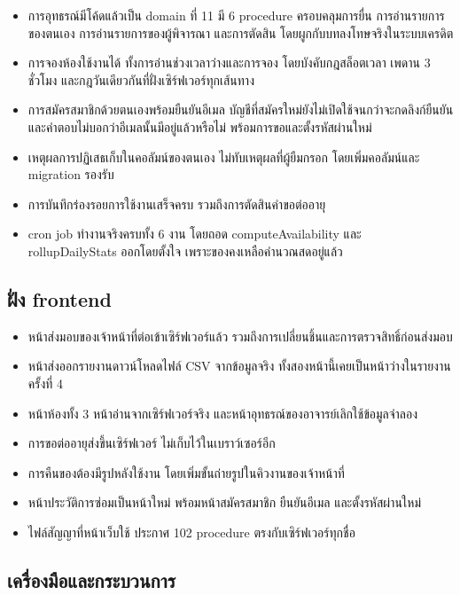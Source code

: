 \begin{itemize}
\item การอุทธรณ์มีโค้ดแล้วเป็น domain ที่ 11 มี 6 procedure ครอบคลุมการยื่น การอ่านรายการของตนเอง การอ่านรายการของผู้พิจารณา และการตัดสิน โดยผูกกับบทลงโทษจริงในระบบเครดิต
\item การจองห้องใช้งานได้ ทั้งการอ่านช่วงเวลาว่างและการจอง โดยบังคับกฎสล็อตเวลา เพดาน 3 ชั่วโมง และกฎวันเดียวกันที่ฝั่งเซิร์ฟเวอร์ทุกเส้นทาง
\item การสมัครสมาชิกด้วยตนเองพร้อมยืนยันอีเมล บัญชีที่สมัครใหม่ยังไม่เปิดใช้จนกว่าจะกดลิงก์ยืนยัน และคำตอบไม่บอกว่าอีเมลนั้นมีอยู่แล้วหรือไม่ พร้อมการขอและตั้งรหัสผ่านใหม่
\item เหตุผลการปฏิเสธเก็บในคอลัมน์ของตนเอง ไม่ทับเหตุผลที่ผู้ยืมกรอก โดยเพิ่มคอลัมน์และ migration รองรับ
\item การบันทึกร่องรอยการใช้งานเสร็จครบ รวมถึงการตัดสินคำขอต่ออายุ
\item cron job ทำงานจริงครบทั้ง 6 งาน โดยถอด computeAvailability และ rollupDailyStats ออกโดยตั้งใจ เพราะของคงเหลือคำนวณสดอยู่แล้ว
\end{itemize}

\subsection{ฝั่ง frontend}

\begin{itemize}
\item หน้าส่งมอบของเจ้าหน้าที่ต่อเข้าเซิร์ฟเวอร์แล้ว รวมถึงการเปลี่ยนชิ้นและการตรวจสิทธิ์ก่อนส่งมอบ
\item หน้าส่งออกรายงานดาวน์โหลดไฟล์ CSV จากข้อมูลจริง ทั้งสองหน้านี้เคยเป็นหน้าว่างในรายงานครั้งที่ 4
\item หน้าห้องทั้ง 3 หน้าอ่านจากเซิร์ฟเวอร์จริง และหน้าอุทธรณ์ของอาจารย์เลิกใช้ข้อมูลจำลอง
\item การขอต่ออายุส่งขึ้นเซิร์ฟเวอร์ ไม่เก็บไว้ในเบราว์เซอร์อีก
\item การคืนของต้องมีรูปหลังใช้งาน โดยเพิ่มขั้นถ่ายรูปในคิวงานของเจ้าหน้าที่
\item หน้าประวัติการซ่อมเป็นหน้าใหม่ พร้อมหน้าสมัครสมาชิก ยืนยันอีเมล และตั้งรหัสผ่านใหม่
\item ไฟล์สัญญาที่หน้าเว็บใช้ ประกาศ 102 procedure ตรงกับเซิร์ฟเวอร์ทุกชื่อ
\end{itemize}

\subsection{เครื่องมือและกระบวนการ}

